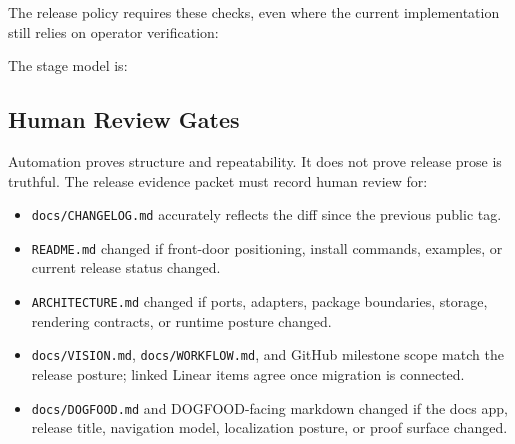 The release policy requires these checks, even where the current implementation still relies on operator verification:



The stage model is:



\subsection{Human Review Gates}\label{record-274-human-review-gates}

Automation proves structure and repeatability. It does not prove release prose is truthful. The release evidence packet must record human review for:

\begin{itemize}
\tightlist
\item
  \texttt{d\allowbreak{}o\allowbreak{}c\allowbreak{}s\allowbreak{}/\allowbreak{}C\allowbreak{}H\allowbreak{}A\allowbreak{}N\allowbreak{}G\allowbreak{}E\allowbreak{}L\allowbreak{}O\allowbreak{}G\allowbreak{}.\allowbreak{}m\allowbreak{}d} accurately reflects the diff since the previous public tag.
\item
  \texttt{R\allowbreak{}E\allowbreak{}A\allowbreak{}D\allowbreak{}M\allowbreak{}E\allowbreak{}.\allowbreak{}m\allowbreak{}d} changed if front-door positioning, install commands, examples, or current release status changed.
\item
  \texttt{A\allowbreak{}R\allowbreak{}C\allowbreak{}H\allowbreak{}I\allowbreak{}T\allowbreak{}E\allowbreak{}C\allowbreak{}T\allowbreak{}U\allowbreak{}R\allowbreak{}E\allowbreak{}.\allowbreak{}m\allowbreak{}d} changed if ports, adapters, package boundaries, storage, rendering contracts, or runtime posture changed.
\item
  \texttt{d\allowbreak{}o\allowbreak{}c\allowbreak{}s\allowbreak{}/\allowbreak{}V\allowbreak{}I\allowbreak{}S\allowbreak{}I\allowbreak{}O\allowbreak{}N\allowbreak{}.\allowbreak{}m\allowbreak{}d}, \texttt{d\allowbreak{}o\allowbreak{}c\allowbreak{}s\allowbreak{}/\allowbreak{}W\allowbreak{}O\allowbreak{}R\allowbreak{}K\allowbreak{}F\allowbreak{}L\allowbreak{}O\allowbreak{}W\allowbreak{}.\allowbreak{}m\allowbreak{}d}, and GitHub milestone scope match the release posture; linked Linear items agree once migration is connected.
\item
  \texttt{d\allowbreak{}o\allowbreak{}c\allowbreak{}s\allowbreak{}/\allowbreak{}D\allowbreak{}O\allowbreak{}G\allowbreak{}F\allowbreak{}O\allowbreak{}O\allowbreak{}D\allowbreak{}.\allowbreak{}m\allowbreak{}d} and DOGFOOD-facing markdown changed if the docs app, release title, navigation model, localization posture, or proof surface changed.

\end{itemize}
